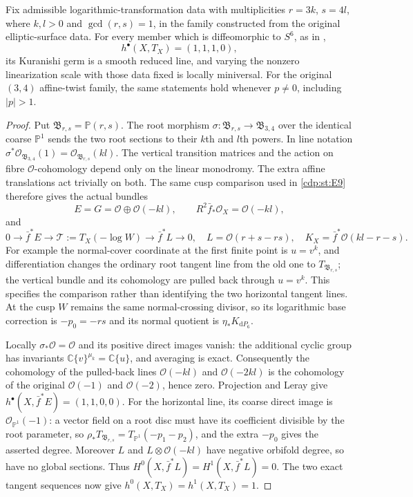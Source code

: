 
\begin{proposition}\label{cdp:st:E11}
Fix admissible logarithmic-transformation data with multiplicities
$r=3k$, $s=4l$, where $k,l>0$ and $\gcd(r,s)=1$, in the family
constructed from the original elliptic-surface data. For every member
which is diffeomorphic to $S^6$, as in
\cite[Theorem labelled \texttt{t:main}]{Viaclovsky2026Log},
\[
 h^\bullet(X,T_X)=(1,1,1,0),
\]
its Kuranishi germ is a smooth reduced line, and varying the nonzero
linearization scale with those data fixed is locally miniversal.
For the original $(3,4)$ affine-twist family, the same statements
hold whenever $p\ne0$, including $|p|>1$.
\end{proposition}
\begin{proof}
Put $\mathfrak B_{r,s}=\mathbb P(r,s)$. The root morphism
$\sigma:\mathfrak B_{r,s}\to\mathfrak B_{3,4}$ over the identical
coarse $\mathbb P^1$ sends the two root sections to their $k$th and
$l$th powers. In line notation
$\sigma^*\mathcal O_{\mathfrak B_{3,4}}(1)
=\mathcal O_{\mathfrak B_{r,s}}(kl)$.
The vertical transition matrices and the action on fibre
$\mathcal O$-cohomology depend only on the linear monodromy.
The extra affine translations act trivially on both. The same
cusp comparison used in \ref{cdp:st:E9} therefore gives the actual bundles
\[
 E=G=\mathcal O\oplus\mathcal O(-kl),\qquad
 R^2\bar f_*\mathcal O_X=\mathcal O(-kl),
\]
and
\[
0\to\bar f^*E\to\mathcal T:=T_X(-\log W)
 \to\bar f^*L\to0,
\quad L=\mathcal O(r+s-rs),
\quad K_X=\bar f^*\mathcal O(kl-r-s).
\]
For example the normal-cover coordinate at the first finite point
is $u=v^k$, and differentiation changes the ordinary root tangent
line from the old one to $T_{\mathfrak B_{r,s}}$; the vertical
bundle and its cohomology are pulled back through $u=v^k$.
This specifies the comparison rather than identifying the two
horizontal tangent lines. At the cusp $W$ remains the same
normal-crossing divisor, so its logarithmic base correction is
$-p_0=-rs$ and its normal quotient is $\eta_*K_{\mathrm dP_6}$.

Locally $\sigma_*\mathcal O=\mathcal O$ and its positive direct
images vanish: the additional cyclic group has invariants
$\mathbb C\{v\}^{\mu_k}=\mathbb C\{u\}$, and averaging is
exact. Consequently the cohomology of the pulled-back lines
$\mathcal O(-kl)$ and $\mathcal O(-2kl)$ is the cohomology of
the original $\mathcal O(-1)$ and $\mathcal O(-2)$, hence zero.
Projection and Leray give
$h^\bullet(X,\bar f^*E)=(1,1,0,0)$.
For the horizontal line, its coarse direct image is
$\mathcal O_{\mathbb P^1}(-1)$: a vector field on a root disc
must have its coefficient divisible by the root parameter,
so $\rho_*T_{\mathfrak B_{r,s}}=T_{\mathbb P^1}(-p_1-p_2)$,
and the extra $-p_0$ gives the asserted degree. Moreover
$L$ and $L\otimes\mathcal O(-kl)$ have negative orbifold degree,
so have no global sections. Thus
$H^0(X,\bar f^*L)=H^1(X,\bar f^*L)=0$.
The two exact tangent sequences now give
$h^0(X,T_X)=h^1(X,T_X)=1$.


\end{proof}
